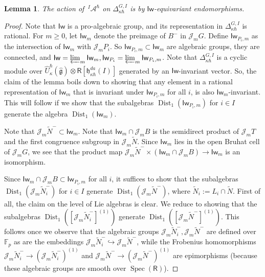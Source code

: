 \documentclass{amsart}
\newtheorem{Lem}[Thm]{Lemma}
\theoremstyle{definition}
\newcommand{\Ring}{\mathsf{R}}
\newcommand{\hg}{\hat{\mathfrak{g}}}
\newcommand{\h}{\mathfrak{h}}
\newcommand{\F}{\mathbb{F}}
\newcommand{\A}{\mathscr{A}}
\newcommand{\Jet}{\mathscr{J}}
\newcommand{\Iw}{\mathsf{Iw}}
\numberwithin{equation}{section}
\begin{document}
\begin{Lem}\label{Lem:Iw_equivariance}
The action of $\,^I\!\A^\hbar$ on  $\Delta^{G,I}_{\kappa\hbar}$ is by $\Iw$-equivariant endomorphisms.
\end{Lem}
\begin{proof}

Note that $\Iw$ is a pro-algebraic group, and its representation in 
$\Delta^{G,I}_{\kappa\hbar}$ is rational. For $m\geqslant 0$, let $\Iw_m$
denote the preimage of $B^-$ in $\Jet_m G$. Define $\Iw_{P_i,m}$ as the intersection of $\Iw_m$ with $\Jet_m P_i$.
So $\Iw_{P_i,m}\subset \Iw_m$ are algebraic groups, they are connected, and $\Iw=\varprojlim_{m}\Iw_m, \Iw_{P_i}=\varprojlim_{m}\Iw_{P_i,m}$. Note that $\Delta_{\kappa\hbar}^{G,I}$ is a cyclic module over $\widehat{U}^\hbar_\kappa(\hg)\otimes \Ring[\h^{da}_{\kappa\hbar}(I)]$ generated by an $\mathsf{Iw}$-invariant vector. So, the claim of the lemma boils down to showing that any element in a rational representation of $\Iw_m$ that is invariant under $\Iw_{P_i,m}$ for all $i$, is also $\Iw_m$-invariant. This will follow if we show that the subalgebras $\operatorname{Dist}_1(\Iw_{P_i,m})$ for $i\in I$ generate the algebra $\operatorname{Dist}_1(\Iw_m)$.

Note that $\Jet_m \tilde{N}^-\subset \Iw_m$. Note that $\Iw_m\cap \Jet_m B$ is the semidirect product of $\Jet_m T$ and the first congruence subgroup in $\Jet_m \tilde{N}$. Since $\Iw_m$ lies in the open Bruhat cell of $\Jet_m G$, we see that
the product map $\Jet_m \tilde{N}^-\times (\Iw_m\cap \Jet_m B)\rightarrow \Iw_m$ is an isomorphism. 

Since $\Iw_m\cap \Jet_m B\subset \Iw_{P_i,m}$
for all $i$, it suffices to show that the subalgebras $\operatorname{Dist}_1(\Jet_m \tilde{N}_i^-)$ for $i\in I$ generate 
$\operatorname{Dist}_1(\Jet_m \tilde{N}^-)$, where $\widetilde{N}_i:=L_i\cap \widetilde{N}$. First of all, the claim on the level of Lie algebras is clear. We reduce to showing that the subalgebras 
$\operatorname{Dist}_1([\Jet_m \tilde{N}_i^-]^{(1)})$ generate $\operatorname{Dist}_1([\Jet_m \tilde{N}^-]^{(1)})$. 
This follows once we observe that the algebraic groups $\Jet_m \tilde{N}_i^-, \Jet_m\tilde{N}^-$ are defined over $\F_p$ as are the embeddings  
$\Jet_m \tilde{N}_i^-\hookrightarrow \Jet_m \tilde{N}^-$, while the Frobenius homomorphisms $\Jet_m \tilde{N}_i^-\rightarrow (\Jet_m \tilde{N}_i^-)^{(1)}$
and $\Jet_m \tilde{N}^-\rightarrow (\Jet_m \tilde{N}^-)^{(1)}$ are epimorphisms (because these algebraic groups are smooth over $\operatorname{Spec}(\Ring)$).
\end{proof}
\end{document}
